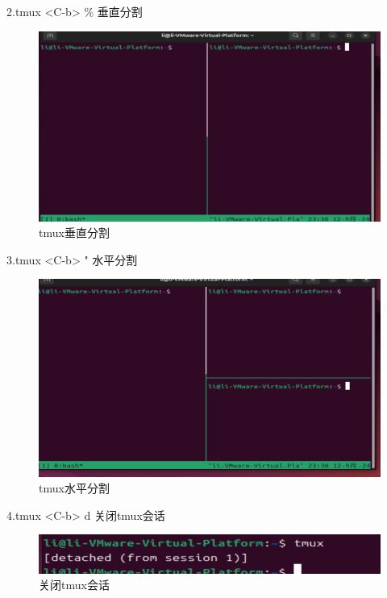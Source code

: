 \documentclass[a4paper, 12pt]{article}
\begin{document}
2.tmux <C-b> \% 垂直分割
\begin{figure}[H]
  \centering
  \includegraphics[width=\textwidth]{屏幕截图 2024-09-12 233822.png}
  \caption{tmux垂直分割}
\end{figure}


3.tmux <C-b> " 水平分割
\begin{figure}[H]
  \centering
  \includegraphics[width=\textwidth]{屏幕截图 2024-09-12 233838.png}
  \caption{tmux水平分割}
\end{figure}

4.tmux <C-b> d 关闭tmux会话
\begin{figure}[H]
  \centering
  \includegraphics[width=\textwidth]{屏幕截图 2024-09-12 233853.png}
  \caption{关闭tmux会话}
\end{figure}
\end{document}
